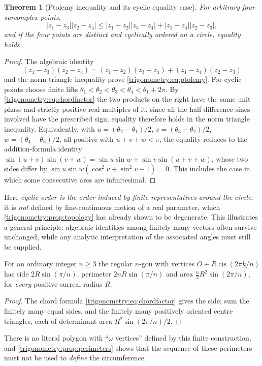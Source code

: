 \documentclass[11pt,letterpaper]{article}
\numberwithin{equation}{section}
\newtheorem{theorem}{Theorem}[section]
\theoremstyle{definition}
\theoremstyle{remark}
\newcommand{\cis}{\operatorname{cis}}
\begin{document}
\begin{theorem}[Ptolemy inequality and its cyclic equality case]\label{trigonometry:thm:ptolemy}
For \emph{arbitrary} four surcomplex points,
\begin{equation}\label{trigonometry:eq:ptolemy}
 |z_1-z_3||z_2-z_4|\le|z_1-z_2||z_3-z_4|+|z_1-z_4||z_2-z_3|,
\end{equation}
and if the four points are distinct and cyclically ordered on a circle, equality holds.
\end{theorem}
\begin{proof}
The algebraic identity
\[
 (z_1-z_3)(z_2-z_4)=(z_1-z_2)(z_3-z_4)+(z_1-z_4)(z_2-z_3)
\]
and the norm triangle inequality prove \cref{trigonometry:eq:ptolemy}. For cyclic points choose
finite lifts $\theta_1<\theta_2<\theta_3<\theta_4<\theta_1+2\pi$. By
\cref{trigonometry:eq:chordfactor} the two products on the right have the same unit phase and
strictly positive real multiples of it, since all the half-difference sines involved have the
prescribed sign; equality therefore holds in the norm triangle inequality. Equivalently, with
$u=(\theta_2-\theta_1)/2$, $v=(\theta_3-\theta_2)/2$, $w=(\theta_4-\theta_3)/2$, all positive with
$u+v+w<\pi$, the equality reduces to the addition-formula identity
$\sin(u+v)\sin(v+w)=\sin u\sin w+\sin v\sin(u+v+w)$, whose two sides differ by
$\sin u\sin w(\cos^2v+\sin^2v-1)=0$. This includes the case in which some consecutive arcs are
infinitesimal.
\end{proof}
Here \emph{cyclic order is the order induced by finite representatives around the circle}; it is
\emph{not} defined by fine-continuous motion of a real parameter, which
\cref{trigonometry:prop:topology} has already shown to be degenerate. This illustrates a general
principle: algebraic identities among finitely many vectors often survive unchanged, while any
analytic interpretation of the associated angles must still be supplied.

\begin{corollary}\label{trigonometry:cor:polygon}
For an ordinary integer $n\ge3$ the regular $n$-gon with vertices $O+R\cis(2\pi k/n)$ has side
$2R\sin(\pi/n)$, perimeter $2nR\sin(\pi/n)$ and area $\frac n2R^2\sin(2\pi/n)$, for \emph{every}
positive surreal radius $R$.
\end{corollary}
\begin{proof}
The chord formula \cref{trigonometry:eq:chordfactor} gives the side; sum the finitely many equal
sides, and the finitely many positively oriented centre triangles, each of determinant area
$R^2\sin(2\pi/n)/2$.
\end{proof}
There is no literal polygon with ``$\omega$ vertices'' defined by this finite construction, and
\cref{trigonometry:prop:perimeters} shows that the sequence of these perimeters must not be used to
\emph{define} the circumference.
\end{document}
